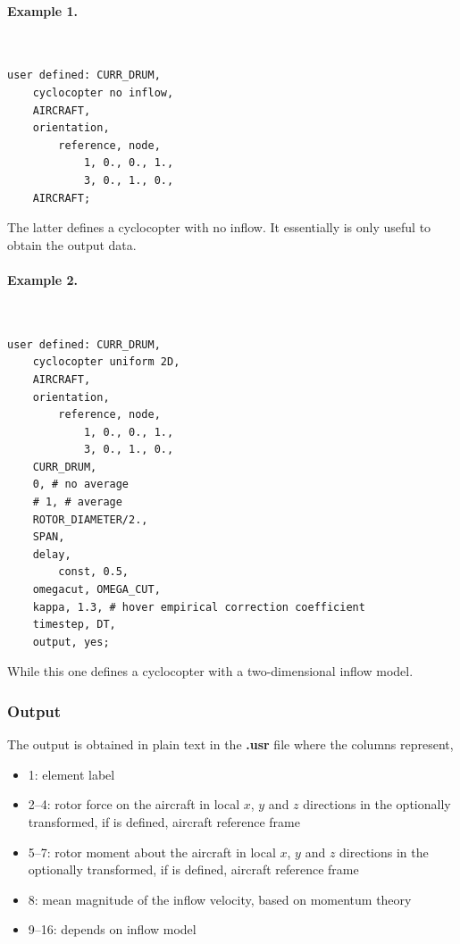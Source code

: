 \paragraph{Example 1.} \
\begin{verbatim}
user defined: CURR_DRUM,
    cyclocopter no inflow,
    AIRCRAFT,
    orientation,
        reference, node,
            1, 0., 0., 1.,
            3, 0., 1., 0.,
    AIRCRAFT;
\end{verbatim}
The latter defines a cyclocopter with no inflow. It essentially is only useful to obtain the output data.

\paragraph{Example 2.} \
\begin{verbatim}
user defined: CURR_DRUM,
    cyclocopter uniform 2D,
    AIRCRAFT,
    orientation,
        reference, node,
    	    1, 0., 0., 1.,
    	    3, 0., 1., 0.,
    CURR_DRUM,
    0, # no average
    # 1, # average
    ROTOR_DIAMETER/2.,
    SPAN,
    delay,
        const, 0.5,
    omegacut, OMEGA_CUT,
    kappa, 1.3, # hover empirical correction coefficient
    timestep, DT,
    output, yes;	
\end{verbatim}
While this one defines a cyclocopter with a two-dimensional inflow model.


\subsubsection{Output}
The output is obtained in plain text in the \textbf{.usr} file where the columns represent,
\begin{itemize}
\item 1: element label
\item 2--4: rotor force on the aircraft in local $x$, $y$ and $z$ directions in the optionally transformed, if  is defined, aircraft reference frame  %
\item 5--7: rotor moment about the aircraft in local $x$, $y$ and $z$ directions in the optionally transformed, if  is defined, aircraft reference frame %
\item 8:  mean magnitude of the inflow velocity, based on momentum theory %
\item 9--16: depends on inflow model
\end{itemize}


